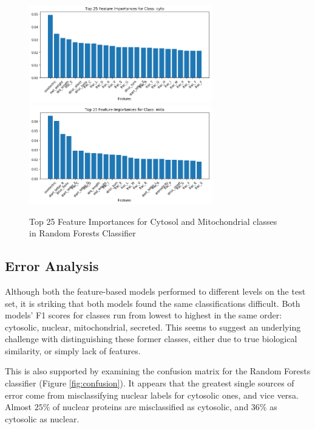 \documentclass{bioinfo}
\begin{document}
\begin{figure}[t]
\includegraphics[width=8cm]{cyto_import}
\centering
\includegraphics[width=8cm]{mito_import}
\centering
\caption{Top 25 Feature Importances for Cytosol and Mitochondrial classes in Random Forests Classifier}
\label{fig:import1}
\end{figure}

\subsection{Error Analysis}

Although both the feature-based models performed to different levels on the test set, it is striking that both models found the same classifications difficult. 
Both models' F1 scores for classes run from lowest to highest in the same order: cytosolic, nuclear, mitochondrial, secreted.
This seems to suggest an underlying challenge with distinguishing these former classes, either due to true biological similarity, or simply lack of features.

This is also supported by examining the confusion matrix for the Random Forests classifier (Figure \ref{fig:confusion}).
It appears that the greatest single sources of error come from misclassifying nuclear labels for cytosolic ones, and vice versa. Almost $25\%$ of nuclear proteins are misclassified as cytosolic, and $36\%$ as cytosolic as nuclear.
\end{document}
